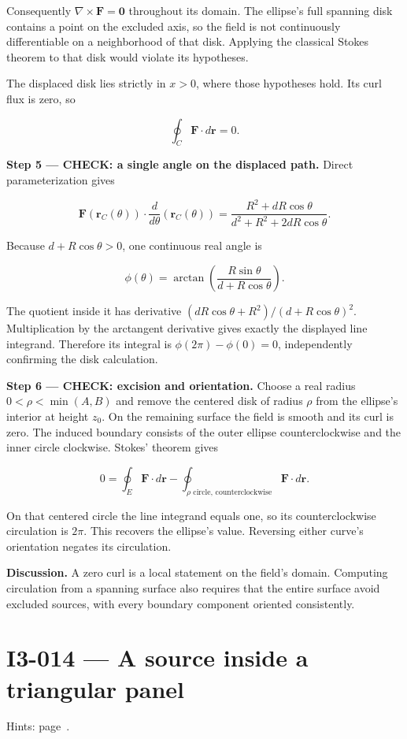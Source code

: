 \documentclass[11pt,oneside,openany]{book}
\begin{document}
Consequently \(\nabla\times\mathbf F=\mathbf0\) throughout its domain. The ellipse's full spanning disk contains a point on the excluded axis, so the field is not continuously differentiable on a neighborhood of that disk. Applying the classical Stokes theorem to that disk would violate its hypotheses.

The displaced disk lies strictly in \(x>0\), where those hypotheses hold. Its curl flux is zero, so

\[
\oint_C\mathbf F\cdot d\mathbf r=0.
\]

\endgroup
\textbf{Step 5 --- CHECK: a single angle on the displaced path.} Direct parameterization gives

\[
\mathbf F(\mathbf r_C(\theta))\cdot\frac{d}{d\theta}(\mathbf r_C(\theta))
=\frac{R^2+dR\cos\theta}{d^2+R^2+2dR\cos\theta}.
\]

Because \(d+R\cos\theta>0\), one continuous real angle is

\[
\phi(\theta)=\arctan\left(\frac{R\sin\theta}{d+R\cos\theta}\right).
\]

The quotient inside it has derivative \((dR\cos\theta+R^2)/(d+R\cos\theta)^2\). Multiplication by the arctangent derivative gives exactly the displayed line integrand. Therefore its integral is \(\phi(2\pi)-\phi(0)=0\), independently confirming the disk calculation.

\textbf{Step 6 --- CHECK: excision and orientation.} Choose a real radius \(0<\rho<\min(A,B)\) and remove the centered disk of radius \(\rho\) from the ellipse's interior at height \(z_0\). On the remaining surface the field is smooth and its curl is zero. The induced boundary consists of the outer ellipse counterclockwise and the inner circle clockwise. Stokes' theorem gives

\[
0=\oint_E\mathbf F\cdot d\mathbf r
-\oint_{\rho\text{ circle, counterclockwise}}\mathbf F\cdot d\mathbf r.
\]

On that centered circle the line integrand equals one, so its counterclockwise circulation is \(2\pi\). This recovers the ellipse's value. Reversing either curve's orientation negates its circulation.

\textbf{Discussion.} A zero curl is a local statement on the field's domain. Computing circulation from a spanning surface also requires that the entire surface avoid excluded sources, with every boundary component oriented consistently.
\clearpage
\section{I3-014 --- A source inside a triangular panel}
\label{problem:I3-014}
{\small Hints: page~\pageref{hints:I3-014}.}\par\medskip
\end{document}
